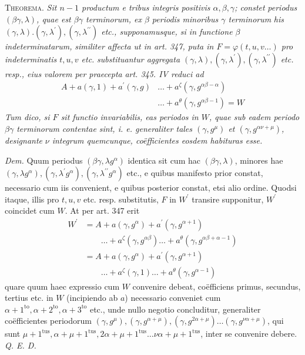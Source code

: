 \textsc{Theorema.} \textit{Sit \(n-1\) productum e tribus integris positivis \(\alpha,\allowbreak \beta,\allowbreak \gamma\); constet} \textit{periodus \((\beta\gamma,\lambda)\), quae est \(\beta\gamma\) terminorum, ex \(\beta\) periodis minoribus \(\gamma\) terminorum} \textit{his \((\gamma,\lambda).(\gamma,\lambda^{\prime}),\allowbreak (\gamma,\lambda^{\prime\prime})\) etc., supponamusque, si in functione \(\beta\) indeterminatarum,} \textit{similiter affecta ut in art. 347, puta in \(F=\varphi(t,u,v\ldots)\) pro indeterminatis \(t,\allowbreak u,\allowbreak v\) etc.} \textit{substituantur aggregata \((\gamma,\lambda),\allowbreak (\gamma,\lambda^{\prime}),\allowbreak (\gamma,\lambda^{\prime\prime})\) etc. resp., eius valorem per praecepta} \textit{art. 345. IV reduci ad} \[\begin{aligned}
A+a(\gamma,1)+a^{\prime}(\gamma,g)&\ldots+a^\zeta(\gamma,g^{\alpha\beta-\alpha})\\
&\ldots+a^\theta(\gamma,g^{\alpha\beta-1})=W
\end{aligned}\] \textit{Tum dico, si \(F\) sit functio invariabilis, eas periodos in \(W\), quae sub eadem periodo} \textit{\(\beta\gamma\) terminorum contentae sint, \textit{i. e.} generaliter tales \((\gamma,g^\mu)\) et \((\gamma,g^{\alpha\nu+\mu})\), designante} \textit{\(\nu\) integrum quemcunque, coëfficientes eosdem habituras esse.}

\textit{Dem.} Quum periodus \((\beta\gamma,\lambda g^\alpha)\) identica sit cum hac \((\beta\gamma,\lambda)\), minores hae \((\gamma,\lambda g^\alpha),\allowbreak (\gamma,\lambda^{\prime}g^\alpha),\allowbreak (\gamma,\lambda^{\prime\prime}g^\alpha)\) etc., e quibus manifesto prior constat, necessario cum iis convenient, e quibus posterior constat, etsi alio ordine. Quodsi itaque, illis pro \(t,\allowbreak u,\allowbreak v\) etc. resp. substitutis, \(F\) in \(W^{\prime}\) transire supponitur, \(W^{\prime}\) coincidet cum \(W\). At per art. 347 erit \[\begin{aligned}
W^{\prime}&=A+a(\gamma,g^\alpha)+a^{\prime}(\gamma,g^{\alpha+1})\\
&\qquad\ldots+a^\zeta(\gamma,g^{\alpha\beta})\ldots+a^\theta(\gamma,g^{\alpha\beta+\alpha-1})\\
&=A+a(\gamma,g^\alpha)+a^{\prime}(\gamma,g^{\alpha+1})\\
&\qquad\ldots+a^\zeta(\gamma,1)\ldots+a^\theta(\gamma,g^{\alpha-1})
\end{aligned}\] quare quum haec expressio cum \(W\) convenire debeat, coëfficiens primus, secundus, tertius etc. in \(W\) (incipiendo ab \(a\)) necessario conveniet cum \(\alpha+1^{\mathrm{to}},\allowbreak \alpha+2^{\mathrm{to}},\allowbreak \alpha+3^{\mathrm{to}}\) etc., unde nullo negotio concluditur, generaliter coëfficientes periodorum \((\gamma,g^\mu),\allowbreak (\gamma,g^{\alpha+\mu}),\allowbreak (\gamma,g^{2\alpha+\mu})\ldots(\gamma,g^{\nu\alpha+\mu})\), qui sunt \(\mu+1^{\mathrm{tus}},\allowbreak \alpha+\mu+1^{\mathrm{tus}},\allowbreak 2\alpha+\mu+1^{\mathrm{tus}}\ldots\nu\alpha+\mu+1^{\mathrm{tus}}\), inter se convenire debere. \textit{Q. E. D.}

